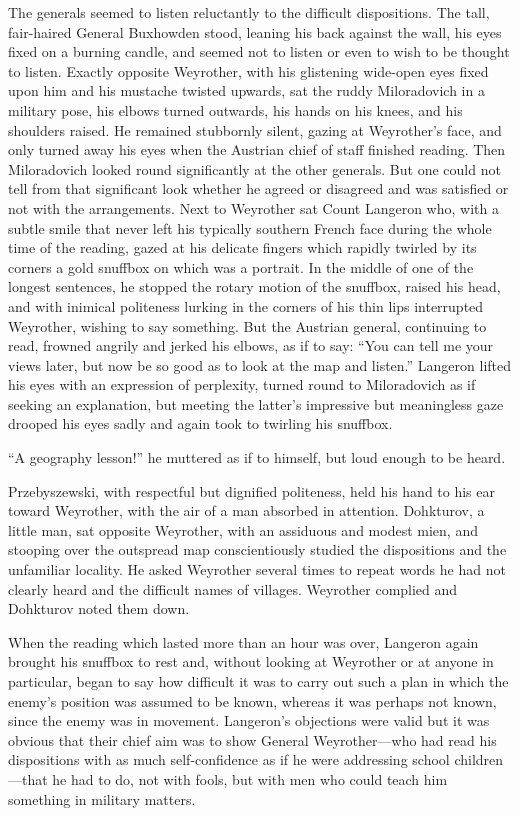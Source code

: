 The generals seemed to listen reluctantly to the difficult
dispositions.  The tall, fair-haired General Buxhowden stood,
leaning his back against the wall, his eyes fixed on a burning
candle, and seemed not to listen or even to wish to be thought to
listen. Exactly opposite Weyrother, with his glistening wide-open
eyes fixed upon him and his mustache twisted upwards, sat the
ruddy Miloradovich in a military pose, his elbows turned
outwards, his hands on his knees, and his shoulders raised. He
remained stubbornly silent, gazing at Weyrother's face, and only
turned away his eyes when the Austrian chief of staff finished
reading. Then Miloradovich looked round significantly at the
other generals. But one could not tell from that significant look
whether he agreed or disagreed and was satisfied or not with the
arrangements. Next to Weyrother sat Count Langeron who, with a
subtle smile that never left his typically southern French face
during the whole time of the reading, gazed at his delicate
fingers which rapidly twirled by its corners a gold snuffbox on
which was a portrait. In the middle of one of the longest
sentences, he stopped the rotary motion of the snuffbox, raised
his head, and with inimical politeness lurking in the corners of
his thin lips interrupted Weyrother, wishing to say
something. But the Austrian general, continuing to read, frowned
angrily and jerked his elbows, as if to say: ``You can tell me
your views later, but now be so good as to look at the map and
listen.'' Langeron lifted his eyes with an expression of
perplexity, turned round to Miloradovich as if seeking an
explanation, but meeting the latter's impressive but meaningless
gaze drooped his eyes sadly and again took to twirling his
snuffbox.

``A geography lesson!'' he muttered as if to himself, but loud
enough to be heard.

Przebyszewski, with respectful but dignified politeness, held his
hand to his ear toward Weyrother, with the air of a man absorbed
in attention. Dohkturov, a little man, sat opposite Weyrother,
with an assiduous and modest mien, and stooping over the
outspread map conscientiously studied the dispositions and the
unfamiliar locality. He asked Weyrother several times to repeat
words he had not clearly heard and the difficult names of
villages. Weyrother complied and Dohkturov noted them down.

When the reading which lasted more than an hour was over,
Langeron again brought his snuffbox to rest and, without looking
at Weyrother or at anyone in particular, began to say how
difficult it was to carry out such a plan in which the enemy's
position was assumed to be known, whereas it was perhaps not
known, since the enemy was in movement.  Langeron's objections
were valid but it was obvious that their chief aim was to show
General Weyrother---who had read his dispositions with as much
self-confidence as if he were addressing school children---that
he had to do, not with fools, but with men who could teach him
something in military matters.

